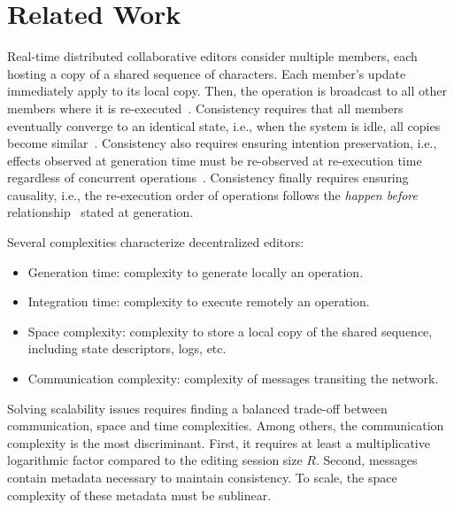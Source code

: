\section{Related Work}
\label{sec:relatedwork}

Real-time distributed collaborative editors consider multiple members, each
hosting a copy of a shared sequence of characters. Each member's update
immediately apply to its local copy. Then, the operation is broadcast to all
other members where it is re-executed~\cite{saito2005optimistic}. Consistency
requires that all members eventually converge to an identical state, i.e., when
the system is idle, all copies become
similar~\cite{bailis2013eventual}. Consistency also requires ensuring intention
preservation, i.e., effects observed at generation time must be re-observed at
re-execution time regardless of concurrent
operations~\cite{sun1998achieving}. Consistency finally requires ensuring
causality, i.e., the re-execution order of operations follows the \emph{happen
  before} relationship~\cite{lamport1978time} stated at generation.

Several complexities characterize decentralized editors:
\begin{itemize}
\item Generation time: complexity to generate locally an operation.
\item Integration time: complexity to execute remotely an operation.
\item Space complexity: complexity to store a local copy of the shared sequence,
  including state descriptors, logs, etc.
\item Communication complexity: complexity of messages transiting the network.
\end{itemize}
Solving scalability issues requires finding a balanced trade-off between
communication, space and time complexities.  Among others, the communication
complexity is the most discriminant. First, it requires at least a
multiplicative logarithmic factor compared to the editing session size
$R$. Second, messages contain metadata necessary to maintain consistency. To
scale, the space complexity of these metadata must be sublinear.

